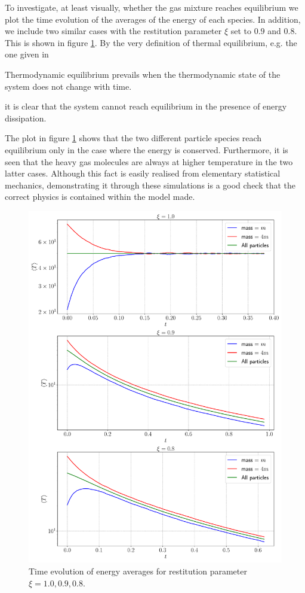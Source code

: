To investigate, at least visually, whether the gas mixture reaches equilibrium we plot the time evolution of the averages of the energy of each species. In addition, we include two similar cases with the restitution parameter $\xi$ set to $0.9$ and $0.8$. This is shown in figure \ref{fig:averages}. By the very definition of thermal equilibrium, e.g. the one given in \cite[p.~3]{huang}

\begin{displayquote}
	Thermodynamic equilibrium prevails when the thermodynamic state of
	the system does not change with time.
\end{displayquote}
	
it is clear that the system cannot reach equilibrium in the presence of energy dissipation.

The plot in figure \ref{fig:averages} shows that the two different particle species reach equilibrium only in the case where the energy is conserved. Furthermore, it is seen that the heavy gas molecules are always at higher temperature in the two latter cases. Although this fact is easily realised from elementary statistical mechanics, demonstrating it through these simulations is a good check that the correct physics is contained within the model made. 

\begin{figure}[htb]
	\centering
	\includegraphics[width = \columnwidth]{../fig/energy_avg.pdf}
	\caption{Time evolution of energy averages for restitution parameter $\xi = 1.0,0.9,0.8$.}
	\label{fig:averages}
\end{figure}

